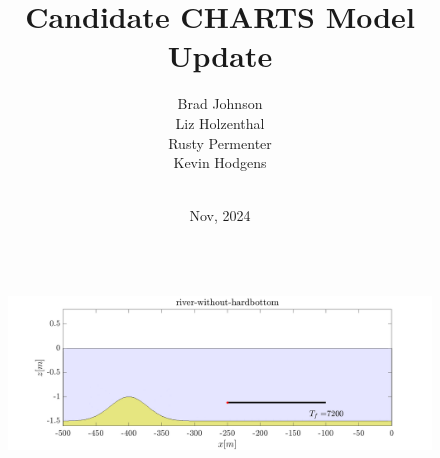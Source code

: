 \documentclass[aspectratio=169]{beamer}
\title[CHARTS]{Candidate CHARTS Model Update} %
\author[]{Brad Johnson\\Liz Holzenthal\\Rusty Permenter \\Kevin Hodgens } %
\institute[ERDC] %
{USACE Engineering Research and Devlelopment Center \\ %
\medskip
\textit{} %
}
\date{\vspace*{-0cm}\\ Nov, 2024} %
\begin{document}
\begin{frame}
  \begin{columns}[c] %
    
    \titlepage %
    \begin{figure}
            \includegraphics[width=1\linewidth]{../../graphics/river_without_hardbottom.png}
    \end{figure}
    
  \end{columns}
\end{frame}
\end{document}
